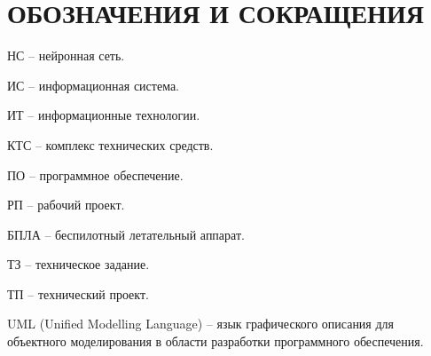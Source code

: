 \section*{ОБОЗНАЧЕНИЯ И СОКРАЩЕНИЯ}

НС -- нейронная сеть.

ИС -- информационная система.

ИТ -- информационные технологии. 

КТС -- комплекс технических средств.

ПО -- программное обеспечение.

РП -- рабочий проект.

БПЛА -- беспилотный летательный аппарат.

ТЗ -- техническое задание.

ТП -- технический проект.

UML (Unified Modelling Language) -- язык графического описания для объектного моделирования в области разработки программного обеспечения.
